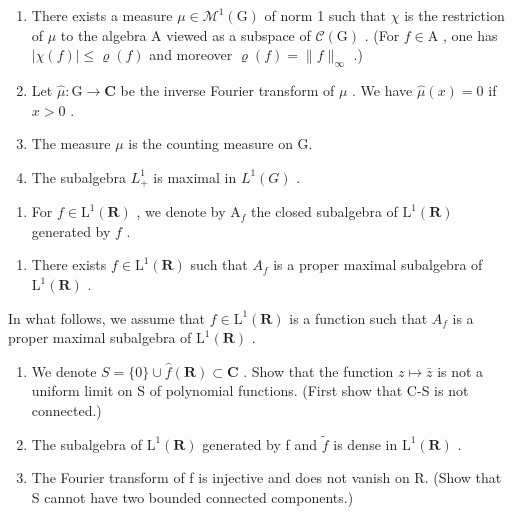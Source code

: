 \begin{enumerate}
\def\labelenumi{\alph{enumi})}
\setcounter{enumi}{4}
\item
  There exists a measure \(\mu \in \mathcal{M}^1 (\mathrm{G})\) of norm 1 such that \(\chi\) is the restriction of \(\mu\) to the algebra A viewed as a subspace of \(\mathcal{C}(\mathrm{G})\) . (For \(f\in \mathrm{A}\) , one has \(|\chi (f)|\leqslant \varrho (f)\) and moreover \(\varrho (f) = \| f\|_{\infty}\) .)
\item
  Let \(\widehat{\mu}\colon\mathrm{G}\to\mathbf{C}\) be the inverse Fourier transform of \(\mu\) . We have \(\widehat{\mu}(x)=0\) if \(x>0\) .
\item
  The measure \(\mu\) is the counting measure on G.
\item
  The subalgebra \(L_{+}^{1}\) is maximal in \(L^{1}(G)\) .
\end{enumerate}

\begin{enumerate}
\def\labelenumi{\arabic{enumi})}
\setcounter{enumi}{18}
\tightlist
\item
  For \(f \in \mathrm{L}^1(\mathbf{R})\) , we denote by \(\mathrm{A}_f\) the closed subalgebra of \(\mathrm{L}^1(\mathbf{R})\) generated by \(f\) .
\end{enumerate}

\begin{enumerate}
\def\labelenumi{\alph{enumi})}
\tightlist
\item
  There exists \(f \in \mathrm{L}^{1}(\mathbf{R})\) such that \(A_{f}\) is a proper maximal subalgebra of \(\mathrm{L}^{1}(\mathbf{R})\) .
\end{enumerate}

In what follows, we assume that \(f \in \mathrm{L}^{1}(\mathbf{R})\) is a function such that \(A_{f}\) is a proper maximal subalgebra of \(\mathrm{L}^{1}(\mathbf{R})\) .

\begin{enumerate}
\def\labelenumi{\alph{enumi})}
\setcounter{enumi}{1}
\item
  We denote \(S = \{0\} \cup \widehat{f}(\mathbf{R}) \subset \mathbf{C}\) . Show that the function \(z \mapsto \overline{z}\) is not a uniform limit on S of polynomial functions. (First show that C-S is not connected.)
\item
  The subalgebra of \(\mathrm{L}^{1}(\mathbf{R})\) generated by f and \(\widetilde{f}\) is dense in \(\mathrm{L}^{1}(\mathbf{R})\) .
\item
  The Fourier transform of f is injective and does not vanish on R. (Show that S cannot have two bounded connected components.)
\end{enumerate}


